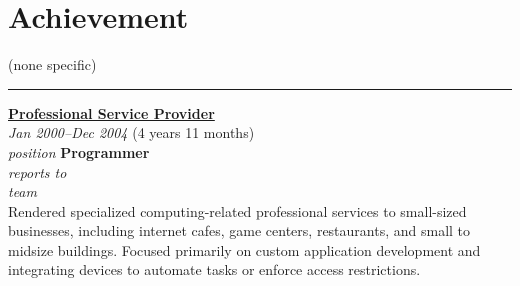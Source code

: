 \documentclass[12pt]{res}
\begin{document}
\begin{resume}
\begin{minipage}[t]{0.55\linewidth}
\begin{multicols}{2}
		\section{}
	\end{multicols}
	\vspace{1pt}
\end{minipage}
\hfill
\begin{minipage}[t]{0.42\linewidth}
	\vspace{18pt}
	\section{Achievement}
	\begin{flushleft}
        \footnotesize{\vspace{2.6pt}
(none specific)}
	\end{flushleft}
\end{minipage}

\vspace{10pt}
\rule{1.0\textwidth}{0.1pt}

\begin{multicols}{2}
	{\large {\bf \href{#}{Professional Service Provider}}} \\
	{\footnotesize{\sl Jan 2000--Dec 2004} \hfill (4 years 11 months)}\\
	{\footnotesize{\sl position} \hfill \bf{Programmer}}\\
	{\footnotesize{\sl reports to} \hfill }\\
	{\footnotesize{\sl team} \hfill }\\

	\columnbreak
	{\footnotesize{Rendered specialized computing-related professional services to small-sized businesses, including internet cafes, game centers, restaurants, and small to midsize buildings. Focused primarily on custom application development and integrating devices to automate tasks or enforce access restrictions.}}\\
\end{multicols}
\vspace{-20pt}

\begin{multicols}{2}

\end{multicols}
\end{resume}
\end{document}
